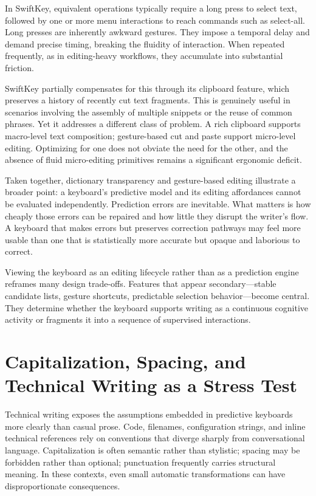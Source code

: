 \documentclass[11pt]{article}
\begin{document}
In SwiftKey, equivalent operations typically require a long press to select text, followed by one or more menu interactions to reach commands such as select-all. Long presses are inherently awkward gestures. They impose a temporal delay and demand precise timing, breaking the fluidity of interaction. When repeated frequently, as in editing-heavy workflows, they accumulate into substantial friction.

SwiftKey partially compensates for this through its clipboard feature, which preserves a history of recently cut text fragments. This is genuinely useful in scenarios involving the assembly of multiple snippets or the reuse of common phrases. Yet it addresses a different class of problem. A rich clipboard supports macro-level text composition; gesture-based cut and paste support micro-level editing. Optimizing for one does not obviate the need for the other, and the absence of fluid micro-editing primitives remains a significant ergonomic deficit.

Taken together, dictionary transparency and gesture-based editing illustrate a broader point: a keyboard’s predictive model and its editing affordances cannot be evaluated independently. Prediction errors are inevitable. What matters is how cheaply those errors can be repaired and how little they disrupt the writer’s flow. A keyboard that makes errors but preserves correction pathways may feel more usable than one that is statistically more accurate but opaque and laborious to correct.

Viewing the keyboard as an editing lifecycle rather than as a prediction engine reframes many design trade-offs. Features that appear secondary—stable candidate lists, gesture shortcuts, predictable selection behavior—become central. They determine whether the keyboard supports writing as a continuous cognitive activity or fragments it into a sequence of supervised interactions.

\section{Capitalization, Spacing, and Technical Writing as a Stress Test}

Technical writing exposes the assumptions embedded in predictive keyboards more clearly than casual prose. Code, filenames, configuration strings, and inline technical references rely on conventions that diverge sharply from conversational language. Capitalization is often semantic rather than stylistic; spacing may be forbidden rather than optional; punctuation frequently carries structural meaning. In these contexts, even small automatic transformations can have disproportionate consequences.
\end{document}

